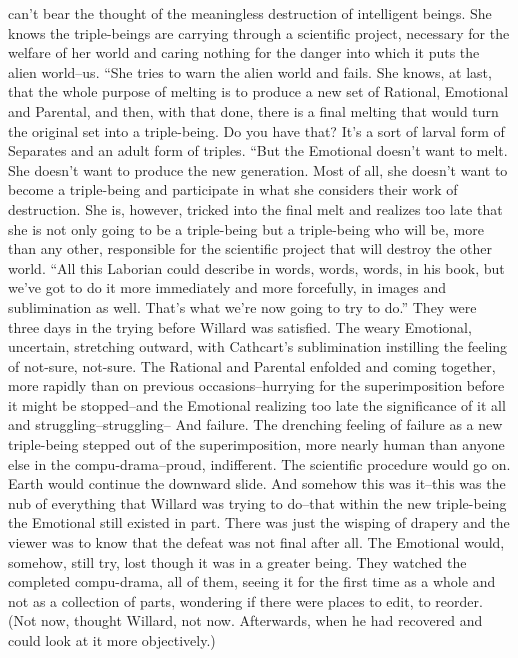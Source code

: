 \documentclass[a4paper,12pt]{article}
\begin{document}
can’t bear the thought of the meaningless destruction of intelligent beings. She knows the triple-beings are
carrying through a scientific project, necessary for the welfare of her world and caring nothing for the
danger into which it puts the alien world--us.
“She tries to warn the alien world and fails. She knows, at last, that the whole purpose of melting
is to produce a new set of Rational, Emotional and Parental, and then, with that done, there is a final
melting that would turn the original set into a triple-being. Do you have that? It's a sort of larval form of
Separates and an adult form of triples.
“But the Emotional doesn't want to melt. She doesn't want to produce the new generation. Most of
all, she doesn't want to become a triple-being and participate in what she considers their work of
destruction. She is, however, tricked into the final melt and realizes too late that she is not only going to be
a triple-being but a triple-being who will be, more than any other, responsible for the scientific project that
will destroy the other world.
“All this Laborian could describe in words, words, words, in his book, but we've got to do it more
immediately and more forcefully, in images and sublimination as well. That's what we're now going to try
to do.”
They were three days in the trying before Willard was satisfied.
The weary Emotional, uncertain, stretching outward, with Cathcart's sublimination instilling the
feeling of not-sure, not-sure. The Rational and Parental enfolded and coming together, more rapidly than on
previous occasions--hurrying for the superimposition before it might be stopped--and the Emotional
realizing too late the significance of it all and struggling--struggling--
And failure. The drenching feeling of failure as a new triple-being stepped out of the
superimposition, more nearly human than anyone else in the compu-drama--proud, indifferent.
The scientific procedure would go on. Earth would continue the downward slide.
And somehow this was it--this was the nub of everything that Willard was trying to do--that
within the new triple-being the Emotional still existed in part. There was just the wisping of drapery and the
viewer was to know that the defeat was not final after all.
The Emotional would, somehow, still try, lost though it was in a greater being.
They watched the completed compu-drama, all of them, seeing it for the first time as a whole and
not as a collection of parts, wondering if there were places to edit, to reorder. (Not now, thought Willard,
not now. Afterwards, when he had recovered and could look at it more objectively.)
\end{document}
